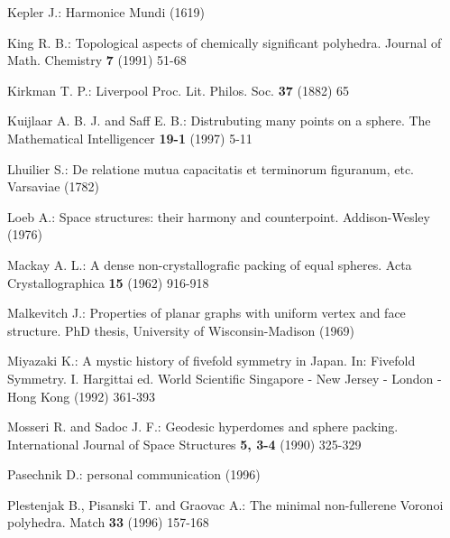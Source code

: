 \begin{thebibliography}{99}
Kepler  J.:
Harmonice Mundi (1619)
\vspace{-3mm}

King R. B.:
Topological aspects of chemically significant polyhedra.
Journal of Math. Chemistry {\bf 7} (1991) 51-68
\vspace{-3mm}

Kirkman T. P.:
Liverpool Proc. Lit. Philos. Soc. {\bf 37} (1882) 65
\vspace{-3mm}

Kuijlaar A. B. J.  and Saff E. B.:
Distrubuting many points on a sphere.
The Mathematical Intelligencer 
{\bf 19-1} (1997) 5-11
\vspace{-3mm}


Lhuilier S.:
De relatione mutua capacitatis et terminorum figuranum, etc.
Varsaviae (1782)
\vspace{-3mm}

Loeb A.:
Space structures: their harmony and counterpoint.
Addison-Wesley (1976)
\vspace{-3mm}

Mackay A. L.:
A dense non-crystallografic packing of equal spheres.
Acta Crystallographica {\bf 15} (1962) 916-918
\vspace{-3mm}

Malkevitch  J.:
Properties of planar graphs with uniform vertex and face structure.
PhD thesis, University of Wisconsin-Madison (1969)
\vspace{-3mm}

Miyazaki K.:
A mystic  history of fivefold symmetry in Japan.
In: Fivefold Symmetry. I. Hargittai ed. World Scientific
Singapore - New Jersey - London - Hong Kong (1992) 361-393
\vspace{-3mm}

Mosseri R. and Sadoc J. F.:
Geodesic hyperdomes and sphere packing.
International Journal of Space Structures {\bf 5, 3-4} (1990) 325-329
\vspace{-3mm}

Pasechnik D.:
personal communication (1996)
\vspace{-3mm}


Plestenjak B., Pisanski T. and Graovac A.:
The minimal non-fullerene Voronoi polyhedra.
Match {\bf 33} (1996) 157-168
\vspace{-3mm}


\end{thebibliography}
